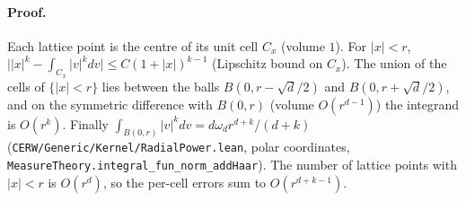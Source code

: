 \paragraph{Proof.} Each lattice point is the centre of its unit cell $C_x$ (volume $1$). For $|x|<r$,
$\bigl||x|^k-\int_{C_x}|v|^kdv\bigr|\le C(1+|x|)^{k-1}$ (Lipschitz bound on $C_x$). The union of the cells of
$\{|x|<r\}$ lies between the balls $B(0,r-\sqrt d/2)$ and $B(0,r+\sqrt d/2)$, and on the symmetric
difference with $B(0,r)$ (volume $O(r^{d-1})$) the integrand is $O(r^k)$. Finally
$\int_{B(0,r)}|v|^kdv=d\omega_dr^{d+k}/(d+k)$ (\texttt{CERW/Generic/Kernel/RadialPower.lean},
polar coordinates, \texttt{MeasureTheory.integral\_fun\_norm\_addHaar}). The number of lattice points
with $|x|<r$ is $O(r^d)$, so the per-cell errors sum to $O(r^{d+k-1})$.
